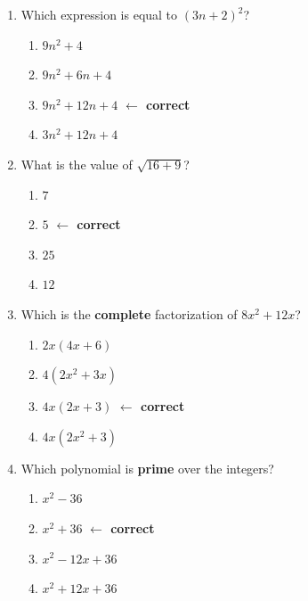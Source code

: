 \begin{enumerate}[leftmargin=1.8em, itemsep=6pt, topsep=5pt]
\small

\item Which expression is equal to $(3n+2)^2$?
\begin{enumerate}[label=(\Alph*), leftmargin=2.2em, itemsep=1pt, topsep=2pt]
  \item $9n^2+4$
  \item $9n^2+6n+4$
  \item $9n^2+12n+4$ \quad \textcolor{keyred}{\textbf{$\leftarrow$ correct}}
  \item $3n^2+12n+4$
\end{enumerate}

\item What is the value of $\sqrt{16+9}$?
\begin{enumerate}[label=(\Alph*), leftmargin=2.2em, itemsep=1pt, topsep=2pt]
  \item $7$
  \item $5$ \quad \textcolor{keyred}{\textbf{$\leftarrow$ correct}}
  \item $25$
  \item $12$
\end{enumerate}

\item Which is the \textbf{complete} factorization of $8x^2+12x$?
\begin{enumerate}[label=(\Alph*), leftmargin=2.2em, itemsep=1pt, topsep=2pt]
  \item $2x(4x+6)$
  \item $4(2x^2+3x)$
  \item $4x(2x+3)$ \quad \textcolor{keyred}{\textbf{$\leftarrow$ correct}}
  \item $4x(2x^2+3)$
\end{enumerate}

\boxguard[7]
\item Which polynomial is \textbf{prime} over the integers?
\begin{enumerate}[label=(\Alph*), leftmargin=2.2em, itemsep=1pt, topsep=2pt]
  \item $x^2-36$
  \item $x^2+36$ \quad \textcolor{keyred}{\textbf{$\leftarrow$ correct}}
  \item $x^2-12x+36$
  \item $x^2+12x+36$
\end{enumerate}


\end{enumerate}
